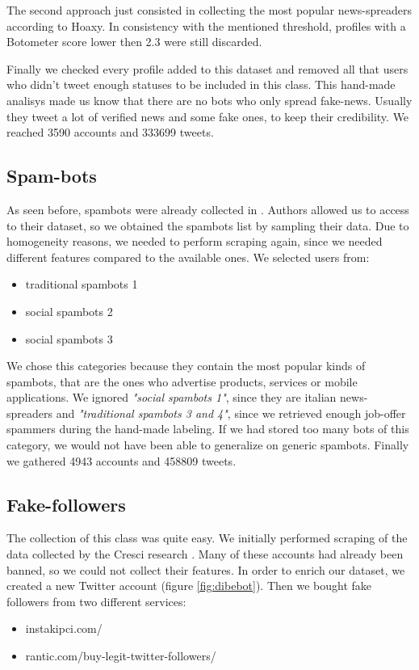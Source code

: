 The second approach just consisted in collecting the most popular news-spreaders according to Hoaxy. In consistency with the mentioned threshold, profiles with a Botometer score lower then 2.3 were still discarded.

Finally we checked every profile added to this dataset and removed all that users who didn't tweet enough statuses to be included in this class. This hand-made analisys made us know that there are no bots who only spread fake-news. Usually they tweet a lot of verified news and some fake ones, to keep their credibility.
We reached 3590 accounts and 333699 tweets.

\subsection{Spam-bots}
As seen before, spambots were already collected in \cite{Cresci}. Authors allowed us to access to their dataset, so we obtained the spambots list by sampling their data. Due to homogeneity reasons, we needed to perform scraping again, since we needed different features compared to the available ones.
We selected users from:
\begin{itemize}
	\item[\PencilRight]traditional spambots 1
	\item[\PencilRight]social spambots 2
	\item[\PencilRight]social spambots 3
\end{itemize}

We chose this categories because they contain the most popular kinds of spambots, that are the ones who advertise products, services or mobile applications. We ignored \emph{"social spambots 1"}, since they are italian news-spreaders and \emph{"traditional spambots 3 and 4"}, since we retrieved enough job-offer spammers during the hand-made labeling. If we had stored too many bots of this category, we would not have been able to generalize on generic spambots. Finally we gathered 4943 accounts and 458809 tweets.

\subsection{Fake-followers}
The collection of this class was quite easy. We initially performed scraping of the data collected by the Cresci research \cite{Cresci}. Many of these accounts had already been banned, so we could not collect their features. In order to enrich our dataset, we created a new Twitter account (figure \ref{fig:dibebot}). Then we bought fake followers from two different services:
\begin{itemize}
	\item[\PencilRight] instakipci.com/
	\item[\PencilRight] rantic.com/buy-legit-twitter-followers/
\end{itemize}

